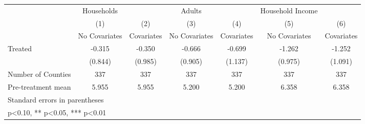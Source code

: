 {
\def\sym#1{\ifmmode^{#1}\else\(^{#1}\)\fi}
\begin{tabular}{l*{6}{c}}
\hline\hline
            &  Households   &               &      Adults   &               &Household Income   &               \\
            &\multicolumn{1}{c}{(1)}&\multicolumn{1}{c}{(2)}&\multicolumn{1}{c}{(3)}&\multicolumn{1}{c}{(4)}&\multicolumn{1}{c}{(5)}&\multicolumn{1}{c}{(6)}\\
            &\multicolumn{1}{c}{No Covariates}&\multicolumn{1}{c}{Covariates}&\multicolumn{1}{c}{No Covariates}&\multicolumn{1}{c}{Covariates}&\multicolumn{1}{c}{No Covariates}&\multicolumn{1}{c}{Covariates}\\
\hline
Treated     &      -0.315   &      -0.350   &      -0.666   &      -0.699   &      -1.262   &      -1.252   \\
            &     (0.844)   &     (0.985)   &     (0.905)   &     (1.137)   &     (0.975)   &     (1.091)   \\
\hline
Number of Counties&         337   &         337   &         337   &         337   &         337   &         337   \\
Pre-treatment mean&       5.955   &       5.955   &       5.200   &       5.200   &       6.358   &       6.358   \\
\hline\hline
\multicolumn{7}{l}{\footnotesize Standard errors in parentheses}\\
\multicolumn{7}{l}{\footnotesize * p<0.10, ** p<0.05, *** p<0.01}\\
\end{tabular}
}
